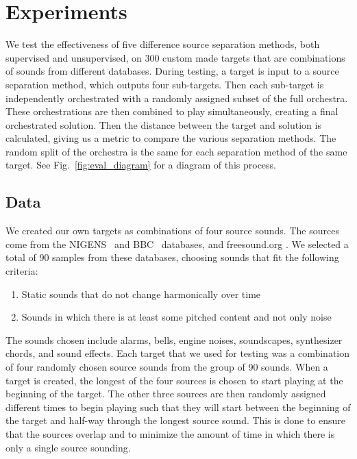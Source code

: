\documentclass{article}
\begin{document}
\section{Experiments}\label{sec:experiments}
  
  We test the effectiveness of five difference source separation methods, both supervised and unsupervised, on 300 custom made targets that are combinations of sounds from different databases. During testing, a target is input to a source separation method, which outputs four sub-targets. Then each sub-target is independently orchestrated with a randomly assigned subset of the full orchestra. These orchestrations are then combined to play simultaneously, creating a final orchestrated solution. Then the distance between the target and solution is calculated, giving us a metric to compare the various separation methods. The random split of the orchestra is the same for each separation method of the same target. See Fig.~\ref{fig:eval_diagram} for a diagram of this process.
  
    \subsection{Data}\label{subsec:data}
    We created our own targets as combinations of four source sounds. The sources come from the NIGENS~\cite{NIGENS} and BBC~\cite{BBC} databases, and freesound.org \cite{freesound}. We selected a total of 90 samples from these databases, choosing sounds that fit the following criteria: 
    
    \begin{enumerate}
    	\item Static sounds that do not change harmonically over time
    	\item Sounds in which there is at least some pitched content and not only noise
    \end{enumerate}     
    The sounds chosen include alarms, bells, engine noises, soundscapes, synthesizer chords, and sound effects. Each target that we used for testing was a combination of four randomly chosen source sounds from the group of 90 sounds. 
    When a target is created, the longest of the four sources is chosen to start playing at the beginning of the target. The other three sources are then randomly assigned different times to begin playing such that they will start between the beginning of the target and half-way through the longest source sound. This is done to ensure that the sources overlap and to minimize the amount of time in which there is only a single source sounding. 
    
\end{document}
